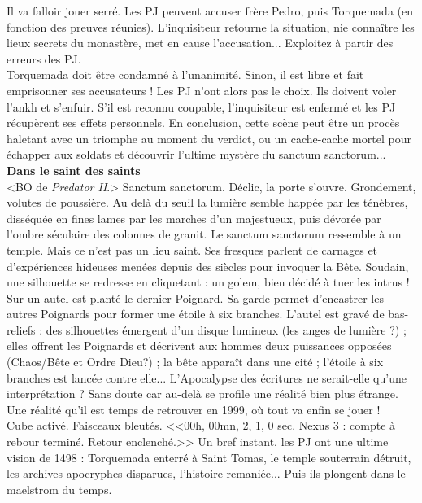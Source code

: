 \documentclass[11pt,twoside,a4paper]{book}
\begin{document}
Il va falloir jouer serr{\'e}. Les PJ peuvent accuser fr{\`e}re Pedro, puis Torquemada (en fonction des preuves r{\'e}unies). L'inquisiteur retourne la situation, nie conna{\^i}tre les lieux secrets du monast{\`e}re, met en cause l'accusation... Exploitez {\`a} partir des erreurs des PJ.~\\

Torquemada doit {\^e}tre condamn{\'e} {\`a} l'unanimit{\'e}. Sinon, il est libre et fait emprisonner ses accusateurs ! Les PJ n'ont alors pas le choix. Ils doivent voler l'ankh et s'enfuir. S'il est reconnu coupable, l'inquisiteur est enferm{\'e} et les PJ r{\'e}cup{\`e}rent ses effets personnels. En conclusion, cette sc{\`e}ne peut {\^e}tre un proc{\`e}s haletant avec un triomphe au moment du verdict, ou un cache-cache mortel pour {\'e}chapper aux soldats et d{\'e}couvrir l'ultime myst{\`e}re du sanctum sanctorum...~\\

\textbf{\large Dans le saint des saints}~\\

<BO de \emph{Predator II}.> Sanctum sanctorum. D{\'e}clic, la porte s'ouvre. Grondement, volutes de poussi{\`e}re. Au del{\`a} du seuil la lumi{\`e}re semble happ{\'e}e par les t{\'e}n{\`e}bres, diss{\'e}qu{\'e}e en fines lames par les marches d'un majestueux, puis d{\'e}vor{\'e}e par l'ombre s{\'e}culaire des colonnes de granit. Le sanctum sanctorum ressemble {\`a} un temple. Mais ce n'est pas un lieu saint. Ses fresques parlent de carnages et d'exp{\'e}riences hideuses men{\'e}es depuis des si{\`e}cles pour invoquer la B{\^e}te. Soudain, une silhouette se redresse en cliquetant : un golem, bien d{\'e}cid{\'e} {\`a} tuer les intrus ! Sur un autel est plant{\'e} le dernier Poignard. Sa garde permet d'encastrer les autres Poignards pour former une {\'e}toile {\`a} six branches. L'autel est grav{\'e} de bas-reliefs : des silhouettes {\'e}mergent d'un disque lumineux (les anges de lumi{\`e}re ?) ; elles offrent les Poignards et d{\'e}crivent aux hommes deux puissances oppos{\'e}es (Chaos/B{\^e}te et Ordre Dieu?) ; la b{\^e}te appara{\^i}t dans une cit{\'e} ; l'{\'e}toile {\`a} six branches est lanc{\'e}e contre elle... L'Apocalypse des {\'e}critures ne serait-elle qu'une interpr{\'e}tation ? Sans doute car au-del{\`a} se profile une r{\'e}alit{\'e} bien plus {\'e}trange. Une r{\'e}alit{\'e} qu'il est temps de retrouver en 1999, o{\`u} tout va enfin se jouer !~\\

Cube activ{\'e}. Faisceaux bleut{\'e}s. <<00h, 00mn, 2, 1, 0 sec. Nexus 3 : compte {\`a} rebour termin{\'e}. Retour enclench{\'e}.>> Un bref instant, les PJ ont une ultime vision de 1498 : Torquemada enterr{\'e} {\`a} Saint Tomas, le temple souterrain d{\'e}truit, les archives apocryphes disparues, l'histoire remani{\'e}e... Puis ils plongent dans le maelstrom du temps.~\\
\end{document}
